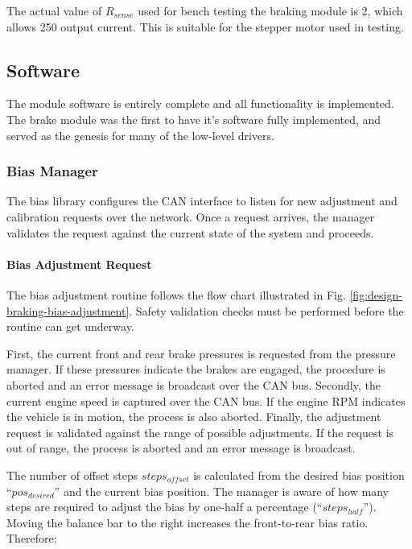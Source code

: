 The actual value of $R_{sense}$ used for bench testing the braking module is \unit{2}{\ohm}, which allows \unit{250}{\milli\ampere} output current. This is suitable for the stepper motor used in testing.

\subsection{Software}

The module software is entirely complete and all functionality is implemented. The brake module was the first to have it's software fully implemented, and served as the genesis for many of the low-level drivers.

\subsubsection{Bias Manager}

The bias library configures the CAN interface to listen for new adjustment and calibration requests over the network. Once a request arrives, the manager validates the request against the current state of the system and proceeds. 

\paragraph{Bias Adjustment Request}
\label{sec:impl_braking_bar}

The bias adjustment routine follows the flow chart illustrated in Fig. \ref{fig:design-braking-bias-adjustment}. Safety validation checks must be performed before the routine can get underway. 

First, the current front and rear brake pressures is requested from the pressure manager. If these pressures indicate the brakes are engaged, the procedure is aborted and an error message is broadcast over the CAN bus. Secondly, the current engine speed is captured over the CAN bus. If the engine RPM indicates the vehicle is in motion, the process is also aborted. Finally, the adjustment request is validated against the range of possible adjustments. If the request is out of range, the process is aborted and an error message is broadcast.

The number of offset steps $steps_{offset}$ is calculated from the desired bias position ``$pos_{desired}$'' and the current bias position. The manager is aware of how many steps are required to adjust the bias by one-half a percentage (``$steps_{half}$''). Moving the balance bar to the right increases the front-to-rear bias ratio. Therefore:

